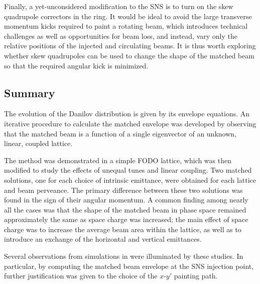 


Finally, a yet-unconsidered modification to the SNS is to turn on the skew quadrupole correctors in the ring. It would be ideal to avoid the large transverse momentum kicks required to paint a rotating beam, which introduces technical challenges as well as opportunities for beam loss, and instead, vary only the relative positions of the injected and circulating beams. It is thus worth exploring whether skew quadrupoles can be used to change the shape of the matched beam so that the required angular kick is minimized.


\subsection{Summary}

The evolution of the Danilov distribution is given by its envelope equations. An iterative procedure to calculate the matched envelope was developed by observing that the matched beam is a function of a single eigenvector of an unknown, linear, coupled lattice. 

The method was demonstrated in a simple FODO lattice, which was then modified to study the effects of unequal tunes and linear coupling. Two matched solutions, one for each choice of intrinsic emittance, were obtained for each lattice and beam perveance. The primary difference between these two solutions was found in the sign of their angular momentum. A common finding among nearly all the cases was that the shape of the matched beam in phase space remained approximately the same as space charge was increased; the main effect of space charge was to increase the average beam area within the lattice, as well as to introduce an exchange of the horizontal and vertical emittances.

Several observations from simulations in \cite{Holmes2018} were illuminated by these studies. In particular, by computing the matched beam envelope at the SNS injection point, further justification was given to the choice of the $x$-$y'$ painting path. 